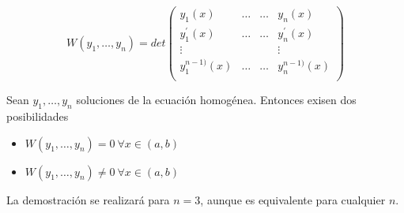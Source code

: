 \documentclass{mathnotes}
\begin{document}
$$W(y_1, \hdots, y_n) = det\begin{pmatrix}
y_1(x)& \hdots& \hdots& y_n(x)\\
y^\prime_1(x)& \hdots& \hdots& y^\prime_n(x)\\
\vdots& & & \vdots\\
y^{n-1)}_1(x)& \hdots& \hdots& y^{n-1)}_n(x)\\
\end{pmatrix}$$

\begin{theorem}
Sean $y_1, \hdots, y_n$ soluciones de la ecuación homogénea. Entonces exisen dos posibilidades
\begin{itemize}
\item $W(y_1, \hdots, y_n) = 0 \ \forall x\in (a,b)$
\item $W(y_1, \hdots, y_n) \neq 0 \ \forall x\in (a,b)$
\end{itemize}
\end{theorem}
La demostración se realizará para $n=3$, aunque es equivalente para cualquier $n$.
\end{document}
